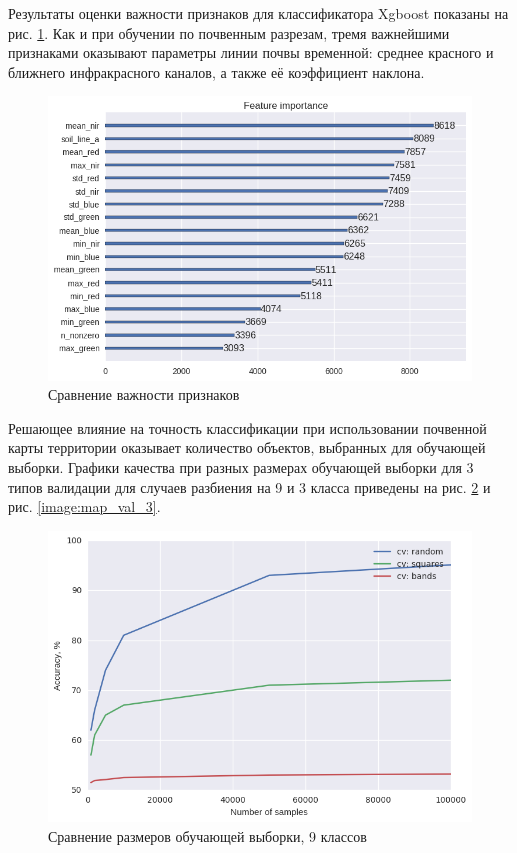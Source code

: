 \documentclass[14pt]{extarticle}
\begin{document}
\par
Результаты оценки важности признаков для классификатора Xgboost показаны на рис. 
\ref{image:map_importance}. Как и при обучении по почвенным разрезам, тремя важнейшими
признаками оказывают параметры линии почвы временной: среднее красного и ближнего инфракрасного
каналов, а также её коэффициент наклона.
\begin{figure}[H]
\centering
\includegraphics[width=\linewidth]{imgs/map_importance.png}
\caption{Сравнение важности признаков}
\label{image:map_importance}
\end{figure}
\par
Решающее влияние на точность классификации при использовании почвенной карты территории оказывает
количество объектов, выбранных для обучающей выборки. Графики качества при разных
размерах обучающей выборки для 3 типов валидации для случаев разбиения на 9 и 3 класса
приведены на рис. \ref{image:map_val_9} и рис. \ref{image:map_val_3}.
\begin{figure}[H]
\centering
\includegraphics[width=\linewidth]{imgs/map_validations_9_classes.png}
\caption{Сравнение размеров обучающей выборки, 9 классов}
\label{image:map_val_9}
\end{figure}
\end{document}
